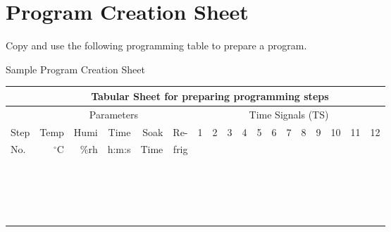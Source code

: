 \clearpage 
\section{Program Creation Sheet}

Copy and use the following programming table to prepare a program. 

\begin{table2}[label={mynamelabel},nameref={Title}]{Sample Program Creation Sheet} {\label{tab:sample-prog-04}}
{%
\begin{tabular}{l | r| r| r| r| r| r| r| r| r| r|r| r| r| r| r| r| r}
\hline %
\multicolumn{1}{l|}{} &  \multicolumn{17}{c}{\bf{Tabular Sheet for preparing programming steps}}          \\
\hline \hline
\multicolumn{1}{l|}{} &  \multicolumn{5}{c|}{Parameters} &   \multicolumn{12}{|c}{Time Signals (TS)}       \\
Step & Temp             & Humi   & Time & Soak & Re-  & 1 & 2 & 3 & 4 & 5 & 6 & 7 & 8 & 9 & 10 & 11 & 12\\
No.  & ${}^{\circ}$C & \%rh & h:m:s & Time &  frig       &  &  &  &  &  &  &  &  &  &  &  & \\
\hline 
 &   &  &   &  &  &  &  &  &  &  &  &  &  &  &  &  & \\
 &   &  &   &  &  &  &  &  &  &  &  &  &  &  &  &  & \\
 &   &  &   &  &  &  &  &  &  &  &  &  &  &  &  &  & \\
 &   &  &   &  &  &  &  &  &  &  &  &  &  &  &  &  & \\
 &   &  &   &  &  &  &  &  &  &  &  &  &  &  &  &  & \\
 &   &  &   &  &  &  &  &  &  &  &  &  &  &  &  &  & \\
 &   &  &   &  &  &  &  &  &  &  &  &  &  &  &  &  & \\
 &   &  &   &  &  &  &  &  &  &  &  &  &  &  &  &  & \\
 &   &  &   &  &  &  &  &  &  &  &  &  &  &  &  &  & \\
 &   &  &   &  &  &  &  &  &  &  &  &  &  &  &  &  & \\
 &   &  &   &  &  &  &  &  &  &  &  &  &  &  &  &  & \\
 &   &  &   &  &  &  &  &  &  &  &  &  &  &  &  &  & \\
 &   &  &   &  &  &  &  &  &  &  &  &  &  &  &  &  & \\
 &   &  &   &  &  &  &  &  &  &  &  &  &  &  &  &  & \\
 &   &  &   &  &  &  &  &  &  &  &  &  &  &  &  &  & \\
 &   &  &   &  &  &  &  &  &  &  &  &  &  &  &  &  & \\
 &   &  &   &  &  &  &  &  &  &  &  &  &  &  &  &  & \\
 &   &  &   &  &  &  &  &  &  &  &  &  &  &  &  &  & \\
\end{tabular} 
}
\end{table2}

